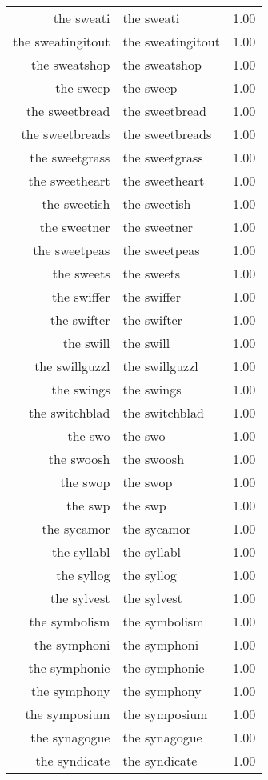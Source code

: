 \begin{table}[ht]
\begin{tabular}{rlr}
  the sweati & the sweati & 1.00 \\ 
  the sweatingitout & the sweatingitout & 1.00 \\ 
  the sweatshop & the sweatshop & 1.00 \\ 
  the sweep & the sweep & 1.00 \\ 
  the sweetbread & the sweetbread & 1.00 \\ 
  the sweetbreads & the sweetbreads & 1.00 \\ 
  the sweetgrass & the sweetgrass & 1.00 \\ 
  the sweetheart & the sweetheart & 1.00 \\ 
  the sweetish & the sweetish & 1.00 \\ 
  the sweetner & the sweetner & 1.00 \\ 
  the sweetpeas & the sweetpeas & 1.00 \\ 
  the sweets & the sweets & 1.00 \\ 
  the swiffer & the swiffer & 1.00 \\ 
  the swifter & the swifter & 1.00 \\ 
  the swill & the swill & 1.00 \\ 
  the swillguzzl & the swillguzzl & 1.00 \\ 
  the swings & the swings & 1.00 \\ 
  the switchblad & the switchblad & 1.00 \\ 
  the swo & the swo & 1.00 \\ 
  the swoosh & the swoosh & 1.00 \\ 
  the swop & the swop & 1.00 \\ 
  the swp & the swp & 1.00 \\ 
  the sycamor & the sycamor & 1.00 \\ 
  the syllabl & the syllabl & 1.00 \\ 
  the syllog & the syllog & 1.00 \\ 
  the sylvest & the sylvest & 1.00 \\ 
  the symbolism & the symbolism & 1.00 \\ 
  the symphoni & the symphoni & 1.00 \\ 
  the symphonie & the symphonie & 1.00 \\ 
  the symphony & the symphony & 1.00 \\ 
  the symposium & the symposium & 1.00 \\ 
  the synagogue & the synagogue & 1.00 \\ 
  the syndicate & the syndicate & 1.00 \\ 

\end{tabular}
\end{table}
